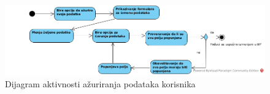 \begin{figure}[H]
\begin{center}
\includegraphics[width=\textwidth]{Pictures/activity_update_user_profile.png}
\end{center}
    \caption{Dijagram aktivnosti ažuriranja podataka korisnika}
\label{fig:ActivityUpdateUserProfile}
\end{figure}
